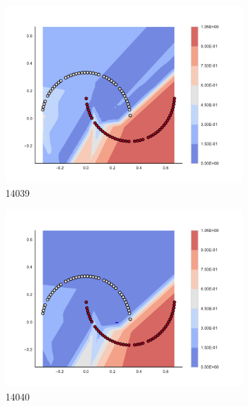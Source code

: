 \begin{figure}[h]
\begin{subfigure}[b]{0.09\textwidth}
    \includegraphics[clip, trim=2.35cm 1.75cm 4.5cm 0cm,width=\textwidth]{img/convergence/14039.pdf}
    \caption{14039}
    \label{fig:convergence_14039}
\end{subfigure}
%
\begin{subfigure}[b]{0.09\textwidth}
    \includegraphics[clip, trim=2.35cm 1.75cm 4.5cm 0cm,width=\textwidth]{img/convergence/14040.pdf}
    \caption{14040}
    \label{fig:convergence_14040}
\end{subfigure}
%
\begin{subfigure}[b]{0.09\textwidth}

\end{subfigure}
\end{figure}
